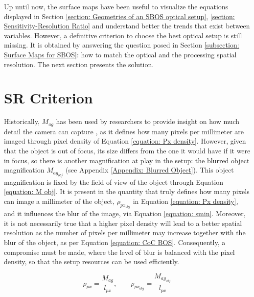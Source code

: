 \par Up until now, the surface maps have been useful to visualize the equations displayed in Section \ref{section: Geometries of an SBOS optical setup}, \ref{section: Sensitivity-Resolution Ratio} and understand better the trends that exist between variables. However, a definitive criterion to choose the best optical setup is still missing. It is obtained by answering the question posed in Section \ref{subsection: Surface Maps for SBOS}: how to match the optical and the processing spatial resolution. The next section presents the solution.

\section{SR Criterion}
\label{section: SR criteria}


\par Historically, $M_{ag}$ has been used by researchers to provide insight on how much detail the camera can capture \cite{Schmidt2025, Gojani&Obayashi}, as it defines how many pixels per millimeter are imaged through pixel density of Equation \ref{equation: Px density}. However, given that the object is out of focus, its size differs from the one it would have if it were in focus, so there is another magnification at play in the setup: the blurred object magnification $M_{ag_{obj}}$ (see Appendix \ref{Appendix: Blurred Object}). This object magnification is fixed by the field of view of the object through Equation \ref{equation: M obj}. It is present in the quantity that truly defines how many pixels can image a millimeter of the object, $\rho_{px_{obj}}$ in Equation \ref{equation: Px density}, and it influences the blur of the image, via Equation \ref{equation: smin}. Moreover, it is not necessarily true that a higher pixel density will lead to a better spatial resolution as the number of pixels per millimeter may increase together with the blur of the object, as per Equation \ref{equation: CoC BOS}. Consequently, a compromise must be made, where the level of blur is balanced with the pixel density, so that the setup resources can be used efficiently.

\begin{equation}
    \label{equation: Px density}
    \rho_{px} = \frac{M_{ag}}{l_{px}},
    \qquad
    \rho_{px_{obj}} = \frac{M_{ag_{obj}}}{l_{px}}
\end{equation}

